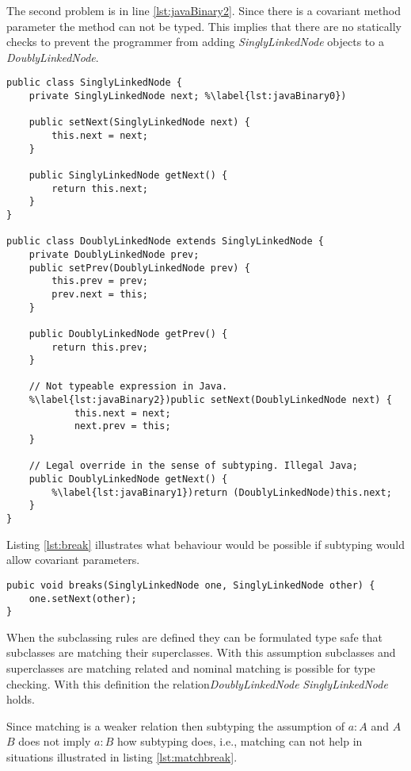The second problem is in line \ref{lst:javaBinary2}. Since there is a covariant 
method parameter the method can not be typed. This implies that there are no statically
checks to prevent the programmer from adding \emph{SinglyLinkedNode} objects to a 
\emph{DoublyLinkedNode}.

\begin{lstlisting}[float,caption={Illegal subtyping of binary methods in Java},label={lst:javaBinary}]
public class SinglyLinkedNode {
	private SinglyLinkedNode next; %\label{lst:javaBinary0})

	public setNext(SinglyLinkedNode next) {
		this.next = next;
	}

	public SinglyLinkedNode getNext() {
		return this.next;
	}
}

public class DoublyLinkedNode extends SinglyLinkedNode {
	private DoublyLinkedNode prev;
	public setPrev(DoublyLinkedNode prev) {
		this.prev = prev;
		prev.next = this;
	}

	public DoublyLinkedNode getPrev() {
		return this.prev;
	}
	
	// Not typeable expression in Java.
	%\label{lst:javaBinary2})public setNext(DoublyLinkedNode next) {
			this.next = next;
			next.prev = this;
	}

	// Legal override in the sense of subtyping. Illegal Java;
	public DoublyLinkedNode getNext() {
		%\label{lst:javaBinary1})return (DoublyLinkedNode)this.next;
	}
}
\end{lstlisting}

Listing \ref{lst:break} illustrates what behaviour would be possible if subtyping 
would allow covariant parameters.

\begin{lstlisting}[float,label={lst:break},caption={Breaking a doubly linked node}]
pubic void breaks(SinglyLinkedNode one, SinglyLinkedNode other) {
	one.setNext(other);
}
\end{lstlisting}

When the subclassing rules are defined they can be formulated
type safe that subclasses are matching their superclasses. With
this assumption subclasses and superclasses are matching related and
nominal matching is possible for type checking. With this definition
the relation\emph{DoublyLinkedNode} \match \emph{SinglyLinkedNode} holds.

Since matching is a weaker relation then subtyping the assumption of $a:A$
and $A$ \match $B$ does not imply $a:B$ how subtyping does, i.e., matching
can not help in situations illustrated in listing \ref{lst:matchbreak}.

